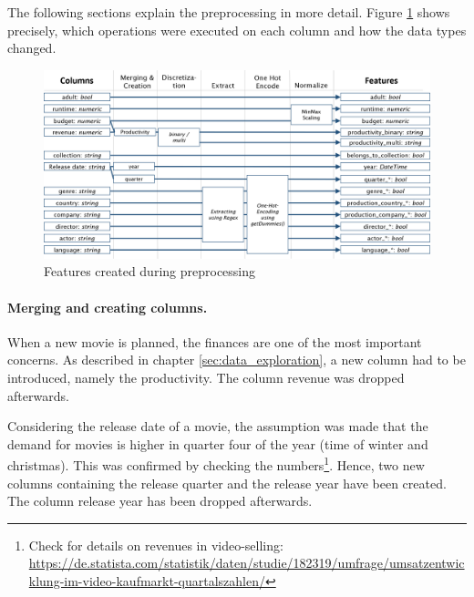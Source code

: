 The following sections explain the preprocessing in more detail. Figure \ref{img:features} shows precisely, which operations were executed on each column and how the data types changed.
\begin{figure}[h]
	\includegraphics[width=\textwidth]{images/3_features.png}
	\caption{Features created during preprocessing}
	\label{img:features}
\end{figure}
\FloatBarrier

\paragraph{Merging and creating columns.}
\label{sec:merge_create}
When a new movie is planned, the finances are one of the most important concerns. As described in chapter \ref{sec:data_exploration}, a new column had to be introduced, namely the productivity.
The column revenue was dropped afterwards.

Considering the release date of a movie, the assumption was made that the demand for movies is higher in quarter four of the year (time of winter and christmas). This was confirmed by checking the numbers\footnote{Check for details on revenues in video-selling:\\ \hyperref{https://de.statista.com/statistik/daten/studie/182319/umfrage/umsatzentwicklung-im-video-kaufmarkt-quartalszahlen/}{link}{Statista revenue movies}{https://de.statista.com/statistik/daten/studie/182319/umfrage/umsatzentwicklung-im-video-kaufmarkt-quartalszahlen/}}. Hence, two new columns containing the release quarter and the release year have been created. The column release year has been dropped afterwards.

